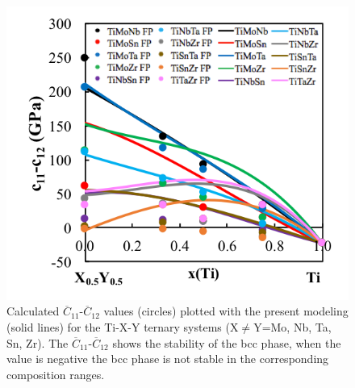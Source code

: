 \pagebreak
\begin{figure}[H]
	\centering
	\includegraphics[width=\textwidth]{Chapter-6/Figures/tixyc11-c12.png}
	\caption{Calculated $\overline{C}_{11}$-$\overline{C}_{12}$ values (circles) plotted with the present modeling (solid lines) for the Ti-X-Y ternary systems (X$\neq$Y=Mo, Nb, Ta, Sn, Zr). The $\overline{C}_{11}$-$\overline{C}_{12}$ shows the stability of the bcc phase, when the value is negative the bcc phase is not stable in the corresponding composition ranges.}
	\label{Ch6-figure:tixyc11-c12}
\end{figure}

